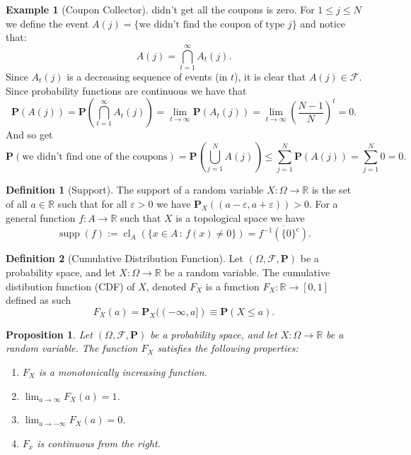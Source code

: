 \documentclass[11pt,a4paper]{article}
\theoremstyle{definition}
\newtheorem{definition}{Definition}[section]
\newtheorem{example}{Example}[section]
\theoremstyle{plain}
\newtheorem{proposition}[theorem]{Proposition}
\newcommand{\R}{\mathbb{R}}
\newcommand{\Prob}{\mathbf{P}}
\begin{document}
\begin{example}[Coupon Collector]
    didn't get all the coupons is zero. For $1 \le j \le N$ we define the
    event $A(j) = \{\text{we didn't find the coupon of type $j$}\}$ and notice
    that:
    \[
      A(j) = \bigcap_{t=1}^{\infty} A_t(j).
    \]
    Since $A_t(j)$ is a decreasing sequence of events (in $t$), it is clear
    that $A(j) \in \mathcal F$. Since probability functions are continuous
    we have that
    \[
      \Prob(A(j)) =
      \Prob\left(\bigcap_{t=1}^{\infty}A_{t}(j)\right) =
      \lim_{t\to\infty}\Prob\left(A_{t}(j)\right) =
      \lim_{t\to\infty}\left({\frac{N-1}{N}}\right)^{t}=0.
    \]
    And so get
    \[
      \Prob(\text{we didn't find one of the coupons}) =
      \Prob\left(\bigcup_{j=1}^{N} A(j)\right) \leq
      \sum_{j=1}^{N} \Prob(A(j)) =
      \sum_{j=1}^{N} 0 =
      0.
    \]
  \end{example}
  \begin{definition}[Support]
    The support of a random variable $X \colon \Omega \to \R$ is the set of all $a \in \R$
    such that for all $\varepsilon > 0$ we have 
    $\Prob_X\left((a - \varepsilon, a + \varepsilon)\right) > 0$.
    For a general function $f \colon A \to \R$ such that $X$ is a topological
    space we have
    \[
      \operatorname {supp} (f) := 
      \operatorname {cl}_{A} 
      \left(\{x\in A\,:\,f(x)\neq 0\}\right) =
      {\overline {f^{-1}\left(\{0\}^{\mathrm {c} }\right)}}.
    \]
  \end{definition}
  \begin{definition}
  [Cumulative Distribution Function]
    Let $(\Omega, \mathcal F, \Prob)$ be a probability space,
    and let $X \colon \Omega \to \R$ be a random variable.
    The cumulative distibution function (CDF) of $X$, denoted $F_X$ is
    a function $F_X \colon \R \to [0,1]$ defined as such
    \[
      F_{X}(a) = \Prob_{X}((-\infty,a]) \equiv \Prob(X \leq a).
    \]
    \end{definition}
  \begin{proposition}
    Let $(\Omega, \mathcal F, \Prob)$ be a probability space,
    and let $X \colon \Omega \to \R$ be a random variable.
    The function $F_X$ satisfies the following properties:
    \begin{enumerate}
      \item $F_X$ is a monotonically increasing function.
      \item $\lim_{a \to \infty} F_X(a) = 1$.
      \item $\lim_{a \to -\infty} F_X(a) = 0$.
      \item $F_x$ is continuous from the right.
    \end{enumerate}
  \end{proposition}
\end{document}
